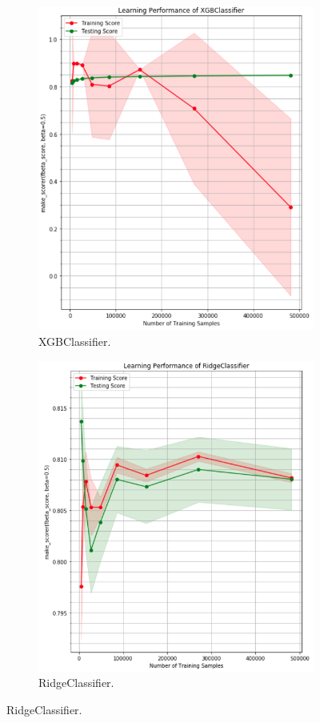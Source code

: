 \documentclass[a4paper]{article}
\begin{document}
			\begin{figure}
				\begin{subfigure}[b]{0.49\textwidth}
					\centering
					\includegraphics[width=1\textwidth]{xgbFullLearningCurve.png}\caption{\label{fig:xgb_full_lc}XGBClassifier.}
				\end{subfigure}
				\begin{subfigure}[b]{0.51\textwidth}
					\centering
					\includegraphics[width=1\textwidth]{RidgeLearningCurve.png}\caption{\label{fig:ridge_lc}RidgeClassifier.}

\end{subfigure}
\end{figure}
\end{document}
